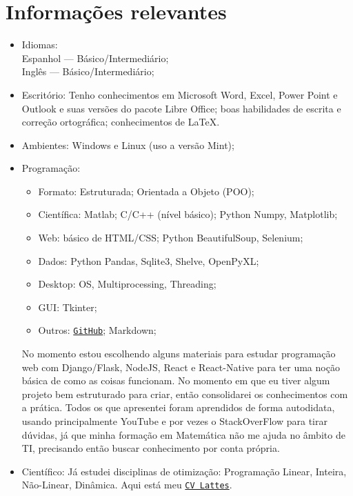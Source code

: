 \documentclass[11pt]{article}
\begin{document}
\section{Informações relevantes \dotfill}
\begin{itemize}
\item Idiomas: \\Espanhol --- Básico/Intermediário;\\ Inglês --- Básico/Intermediário;

\item Escritório: Tenho conhecimentos em Microsoft Word, Excel, Power Point e Outlook e suas versões do pacote Libre Office; boas habilidades de escrita e correção ortográfica; conhecimentos de LaTeX.

\item Ambientes: Windows e Linux (uso a versão Mint);

\item Programação:
\begin{itemize}
\item Formato: Estruturada; Orientada a Objeto (POO);
\item Científica: Matlab; C/C++ (nível básico); Python Numpy, Matplotlib;
\item Web: básico de HTML/CSS; Python BeautifulSoup, Selenium;
\item Dados: Python Pandas, Sqlite3, Shelve, OpenPyXL;
\item Desktop: OS, Multiprocessing, Threading;
\item GUI: Tkinter;
\item Outros: \href{https://github.com/j5r}{\texttt{GitHub}}; Markdown;
\end{itemize}
No momento estou escolhendo alguns materiais para estudar programação web com Django/Flask, NodeJS, React e React-Native para ter uma noção básica de como as coisas funcionam.  No momento em que eu tiver algum projeto bem estruturado para criar, então consolidarei os conhecimentos com a prática. Todos os que apresentei foram aprendidos de forma autodidata, usando principalmente YouTube e por vezes o StackOverFlow para tirar dúvidas, já que minha formação em Matemática não me ajuda no âmbito de TI, precisando então buscar conhecimento por conta própria.

\item Científico: Já estudei disciplinas de otimização: Programação Linear, Inteira, Não-Linear, Dinâmica. 
Aqui está meu \href{http://lattes.cnpq.br/3866983332299702}{\texttt{CV Lattes}}.


\end{itemize}
\end{document}
